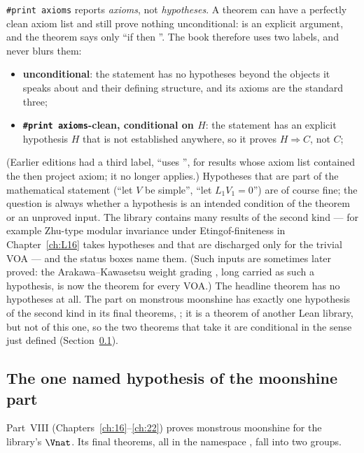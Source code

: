 \texttt{\#print axioms} reports \emph{axioms}, not \emph{hypotheses}. A theorem
 can have a perfectly clean axiom list and still
prove nothing unconditional:  is an explicit argument, and the theorem says only ``if
 then ''. The book therefore uses two labels, and never
blurs them:
\begin{itemize}
\item \textbf{unconditional}: the statement has no hypotheses beyond the objects it speaks about and
  their defining structure, and its axioms are the standard three;
\item \textbf{\texttt{\#print axioms}-clean, conditional on $H$}: the statement has an explicit
  hypothesis $H$ that is not established anywhere, so it proves $H\Rightarrow C$, not $C$;
\end{itemize}
(Earlier editions had a third label, ``uses '', for results whose axiom list contained
the then project axiom; it no longer applies.)
Hypotheses that are part of the mathematical statement (``let $V$ be simple'', ``let
$L_1V_1 = 0$'') are of course fine; the question is always whether a hypothesis is an intended
condition of the theorem or an unproved input. The library contains many results of the second kind
--- for example Zhu-type modular invariance under Etingof-finiteness in
Chapter~\ref{ch:L16} takes hypotheses  and  that are discharged only for the trivial
VOA --- and the status boxes name them. (Such inputs are sometimes later proved: the Arakawa--Kawasetsu weight grading
, long carried as such a hypothesis, is now the theorem  for every VOA.) The headline theorem  has no hypotheses at all.
The part on monstrous moonshine has exactly one hypothesis of the second kind in its final theorems, ;
it is a theorem of another Lean library, but not of this one, so the two theorems that take it are conditional in the
sense just defined (Section~\ref{ch01:sec:gmat}).

\subsection{The one named hypothesis of the moonshine part}\label{ch01:sec:gmat}

Part~VIII (Chapters~\ref{ch:16}--\ref{ch:22}) proves monstrous moonshine for the library's $\Vnat$. Its final
theorems, all in the namespace , fall into two groups.

